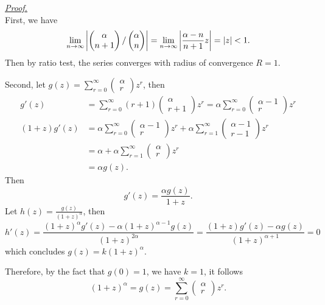 \documentclass[12pt]{article}
\renewenvironment{proof}[1][Proof]{\begin{snugshade*} \underline{\textit{{#1}.}}\\}{\hfill \qedsymbol \end{snugshade*}}
\begin{document}
    \begin{proof}
        First, we have \[\lim_{n\to\infty}\abs{\begin{pmatrix}
            \alpha\\n+1
        \end{pmatrix}/\begin{pmatrix}
            \alpha\\n
        \end{pmatrix}}=\lim_{n\to\infty}\abs{\frac{\alpha-n}{n+1}z}=\abs{z}<1.\] Then by ratio test, the series converges with radius of convergence $R=1$.

        Second, let $g(z)=\sum_{r=0}^{\infty}\begin{pmatrix}
            \alpha\\r
        \end{pmatrix}z^r$, then \begin{align*}
            g'(z)&=\sum_{r=0}^{\infty}(r+1)\begin{pmatrix}
                \alpha\\r+1
            \end{pmatrix}z^r=\alpha\sum_{r=0}^{\infty}\begin{pmatrix}
                \alpha-1\\r
            \end{pmatrix}z^r\\
            (1+z)g'(z)&=\alpha\sum_{r=0}^{\infty}\begin{pmatrix}
                \alpha-1\\r
            \end{pmatrix}z^r+\alpha\sum_{r=1}^{\infty}\begin{pmatrix}
                \alpha-1\\r-1
            \end{pmatrix}z^{r}\\
            &=\alpha+\alpha\sum_{r=1}^{\infty}\begin{pmatrix}
                \alpha\\r
            \end{pmatrix}z^r\\
            &=\alpha g(z).
        \end{align*}
        Then \[g'(z)=\frac{\alpha g(z)}{1+z}.\] Let $h(z)=\frac{g(z)}{(1+z)^\alpha}$, then \[h'(z)=\frac{(1+z)^\alpha g'(z)-\alpha(1+z)^{\alpha-1}g(z)}{(1+z)^{2\alpha}}=\frac{(1+z)g'(z)-\alpha g(z)}{(1+z)^{\alpha+1}}=0\] which concludes $g(z)=k(1+z)^{\alpha}$.

        Therefore, by the fact that $g(0)=1$, we have $k=1$, it follows \[(1+z)^\alpha=g(z)=\sum_{r=0}^{\infty}\begin{pmatrix}
            \alpha\\r
        \end{pmatrix}z^r.\]
    \end{proof}
\end{document}
